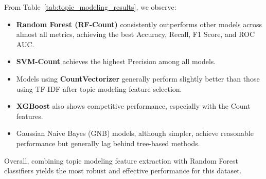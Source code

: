 From Table~\ref{tab:topic_modeling_results}, we observe:
\begin{itemize}
    \item \textbf{Random Forest (RF-Count)} consistently outperforms other models across almost all metrics, achieving the best Accuracy, Recall, F1 Score, and ROC AUC.
    \item \textbf{SVM-Count} achieves the highest Precision among all models.
    \item Models using \textbf{CountVectorizer} generally perform slightly better than those using TF-IDF after topic modeling feature selection.
    \item \textbf{XGBoost} also shows competitive performance, especially with the Count features.
    \item Gaussian Naive Bayes (GNB) models, although simpler, achieve reasonable performance but generally lag behind tree-based methods.
\end{itemize}

Overall, combining topic modeling feature extraction with Random Forest classifiers yields the most robust and effective performance for this dataset.

